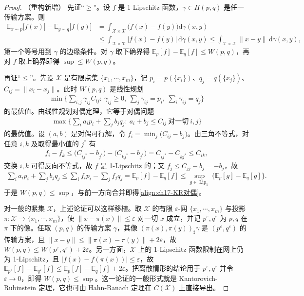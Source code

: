 \documentclass[../../main.tex]{subfiles}
\begin{document}
\begin{proof}（重构新增）
先证“$\geqslant$”。设 $f$ 是 1-Lipschitz 函数，$\gamma\in\Pi(p,q)$ 是任一传输方案。则
\begin{align*}
\mathbb{E}_{x\sim p}\big[f(x)\big]-\mathbb{E}_{y\sim q}\big[f(y)\big]
&=\int_{\mathcal{X}\times\mathcal{X}}\big(f(x)-f(y)\big)\mathrm{d}\gamma(x,y)\\
&\leqslant\int_{\mathcal{X}\times\mathcal{X}}\big|f(x)-f(y)\big|\,\mathrm{d}\gamma(x,y)
\leqslant\int_{\mathcal{X}\times\mathcal{X}}\|x-y\|\,\mathrm{d}\gamma(x,y),
\end{align*}
第一个等号用到 $\gamma$ 的边缘条件。对 $\gamma$ 取下确界得 $\mathbb{E}_p[f]-\mathbb{E}_q[f]\leqslant W(p,q)$，再对 $f$ 取上确界即得 $\sup\leqslant W(p,q)$。

再证“$\leqslant$”。先设 $\mathcal{X}$ 是有限点集 $\{x_1,\cdots,x_m\}$，记 $p_i=p(\{x_i\})$、$q_j=q(\{x_j\})$、$C_{ij}=\|x_i-x_j\|$。此时 $W(p,q)$ 是线性规划
\begin{align*}
\min\Big\{\sum_{i,j}\gamma_{ij}C_{ij}:\ \gamma_{ij}\geqslant0,\ \sum_{j}\gamma_{ij}=p_i,\ \sum_{i}\gamma_{ij}=q_j\Big\}
\end{align*}
的最优值。由线性规划对偶定理，它等于对偶问题
\begin{align*}
\max\Big\{\sum_{i}a_ip_i+\sum_{j}b_jq_j:\ a_i+b_j\leqslant C_{ij}\ \text{对一切}\ i,j\Big\}
\end{align*}
的最优值。设 $(a,b)$ 是对偶可行解，令 $f_i=\min_j\big(C_{ij}-b_j\big)$。由三角不等式，对任意 $i,k$ 及取得最小值的 $j^*$ 有
\begin{align*}
f_i-f_k\leqslant\big(C_{ij^*}-b_{j^*}\big)-\big(C_{kj^*}-b_{j^*}\big)=C_{ij^*}-C_{kj^*}\leqslant C_{ik},
\end{align*}
交换 $i,k$ 可得反向不等式，故 $f$ 是 1-Lipschitz 的；又 $f_j\leqslant C_{jj}-b_j=-b_j$，故
\begin{align*}
\sum_{i}a_ip_i+\sum_{j}b_jq_j\leqslant\sum_{i}f_ip_i-\sum_{j}f_jq_j=\mathbb{E}_{p}[f]-\mathbb{E}_{q}[f]\leqslant\sup_{g\in\operatorname{Lip}_1}\Big\{\mathbb{E}_{p}[g]-\mathbb{E}_{q}[g]\Big\}.
\end{align*}
于是 $W(p,q)\leqslant\sup$，与前一方向合并即得\eqref{align:ch17-KR对偶}。

对一般的紧集 $\mathcal{X}$，上述论证可以这样移植。取 $\mathcal{X}$ 的有限 $\varepsilon$-网 $\{x_1,\cdots,x_m\}$ 与投影 $\pi:\mathcal{X}\to\{x_1,\cdots,x_m\}$，使 $\|x-\pi(x)\|\leqslant\varepsilon$ 对一切 $x$ 成立，并记 $p^{\varepsilon},q^{\varepsilon}$ 为 $p,q$ 在 $\pi$ 下的像。任取 $(p,q)$ 的传输方案 $\gamma$，其像 $(\pi(x),\pi(y))_{\sharp}\gamma$ 是 $(p^{\varepsilon},q^{\varepsilon})$ 的传输方案，且 $\|x-y\|\leqslant\|\pi(x)-\pi(y)\|+2\varepsilon$，故 $W(p,q)\leqslant W(p^{\varepsilon},q^{\varepsilon})+2\varepsilon$。另一方面，$\mathcal{X}$ 上的 1-Lipschitz 函数限制在网上仍为 1-Lipschitz，且 $|f(x)-f(\pi(x))|\leqslant\varepsilon$，故 $\mathbb{E}_{p^{\varepsilon}}[f]-\mathbb{E}_{q^{\varepsilon}}[f]\leqslant\mathbb{E}_{p}[f]-\mathbb{E}_{q}[f]+2\varepsilon$。把离散情形的结论用于 $p^{\varepsilon},q^{\varepsilon}$ 并令 $\varepsilon\to0$，即得 $W(p,q)\leqslant\sup$。这一论证的一般形式就是 Kantorovich-Rubinstein 定理，它也可由 Hahn-Banach 定理在 $C(\mathcal{X})$ 上直接导出。
\end{proof}
\end{document}
